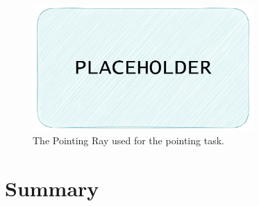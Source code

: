 \begin{figure}[t]
    \centering
     \includegraphics[width=0.75\textwidth]{NOVAthesisFiles/Images/placeholder.pdf}
     \caption[The Pointing Ray used for the pointing task.]
     {The Pointing Ray used for the pointing task.}
     \label{fig:likert-scale-ui}
\end{figure}


\section{Summary}
\label{sec:summary}
 


